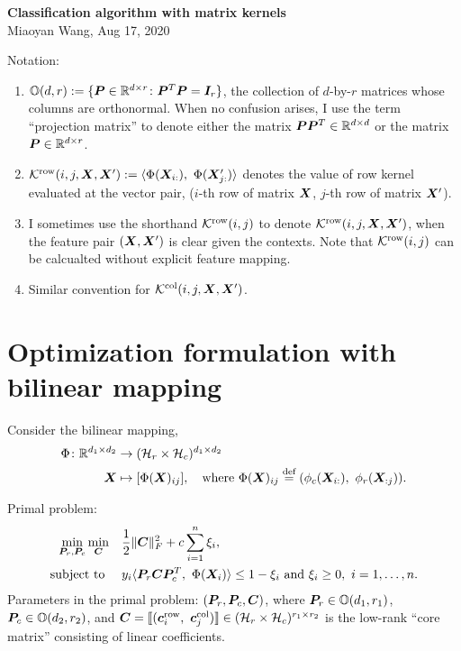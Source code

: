 \documentclass[11pt]{article}
\theoremstyle{plain}
\theoremstyle{definition}
\begin{document}
\begin{center}
{\bf \Large Classification algorithm with matrix kernels}\\
Miaoyan Wang, Aug 17, 2020\\
\end{center}
Notation: 
\begin{enumerate}
\item $\mathbb{O}(d,r):=\{\bm{P}\in\mathbb{R}^{d\times r}\colon \bm{P}^T\bm{P}=\bm I_r\}$, the collection of $d$-by-$r$ matrices whose columns are orthonormal. When no confusion arises, I use the term ``projection matrix'' to denote either the matrix $\bm{P}\bm{P}^T\in\mathbb{R}^{d\times d}$ or the matrix $\bm{P}\in\mathbb{R}^{d\times r}$.
\item $\mathcal{K}^{\text{row}}(i,j,\bm X,\bm X') : =\langle \Phi(\bm X_{i:}),\ \Phi(\bm X'_{j:}) \rangle $ denotes the value of row kernel evaluated at the vector pair, ($i$-th row of matrix $\bm X$, $j$-th row of matrix $\bm X'$). 
\item I sometimes use the shorthand $\mathcal{K}^{\text{row}}(i,j)$ to denote $\mathcal{K}^{\text{row}}(i,j,\bm X,\bm X')$, when the feature pair $(\bm X, \bm X')$ is clear given the contexts. Note that $\mathcal{K}^{\text{row}}(i,j)$ can be calcualted without explicit feature mapping. 

\item Similar convention for $\mathcal{K}^{\text{col}}(i,j,\bm X,\bm X')$.
\end{enumerate}

\section{Optimization formulation with bilinear mapping}
Consider the bilinear mapping,
\begin{align}
\Phi\colon \mathbb{R}^{d_1\times d_2}& \to (\tH_r\times \tH_c)^{d_1\times d_2}\\
\mX& \mapsto [\Phi(\mX)_{ij}],\quad \text{where}\ \Phi(\mX)_{ij}\stackrel{\text{def}}{=}(\phi_c(\mX_{i:}),\ \phi_r(\mX_{:j})).
\end{align}

Primal problem:
\begin{align}\label{eq:opt}
\min_{\mP_r, \mP_c}\min_{\mC}&\quad {1\over 2}\FnormSize{}{\mC}^2 + c\sum_{i=1}^ n \xi_i,\\
\text{subject to }&\quad y_i\langle \mP_r\mC\mP_c^T,\ \Phi(\mX_i)\rangle \leq 1-\xi_i \text{ and}\ \xi_i\geq 0,\ i=1,\ldots,n.
\end{align}
Parameters in the primal problem: $(\bm{P}_r, \bm{P}_c, \bm C)$, where $\bm{P}_r\in\mathbb{O}(d_1,r_1)$, $\bm{P}_c\in\mathbb{O}(d_2,r_2)$, and $\mC=\entry{(\mc^{\text{row}}_i,\ \mc^{\text{col}}_j)} \in (\tH_r\times \tH_c)^{r_1\times r_2}$ is the low-rank ``core matrix'' consisting of linear coefficients. 
\end{document}
